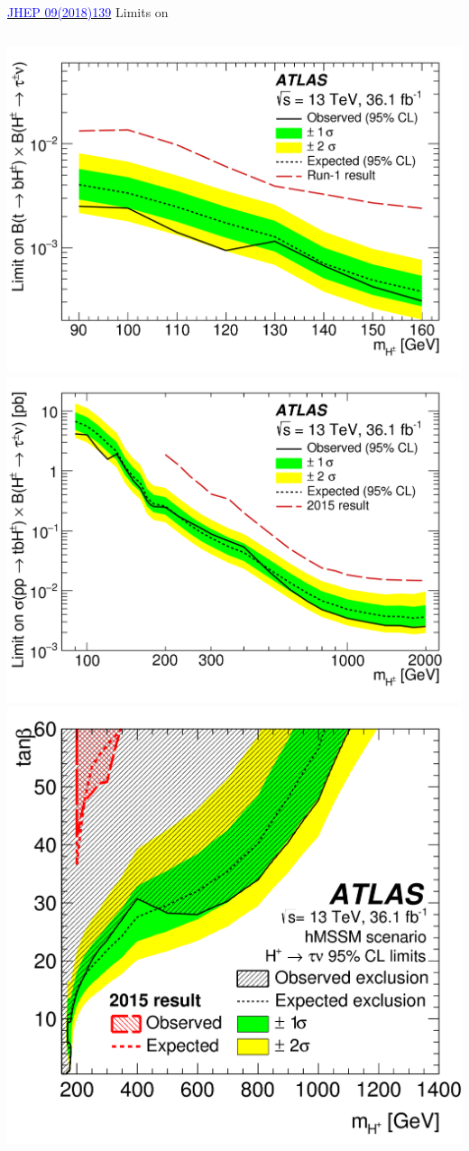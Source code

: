\documentclass[aspectratio=169,xcolor=table]{beamer}
\begin{document}
    \begin{frame}{\href{https://link.springer.com/article/10.1007/JHEP09(2018)139}{\textcolor{blue}{JHEP 09(2018)139}} Limits on }
      \begin{columns}
        \centering
        \includegraphics[width=.65\textwidth,keepaspectratio=true]{Limits/Combined_low_NoLabel_2018.png}
        \includegraphics[width=.65\textwidth,keepaspectratio=true]{Limits/Combined_CrossSection_2018.png}
        \centering
        \includegraphics[width=\textwidth,keepaspectratio=true]{Limits/tanB_Limit_2018.png}
      \end{columns}
    \end{frame}
\end{document}
